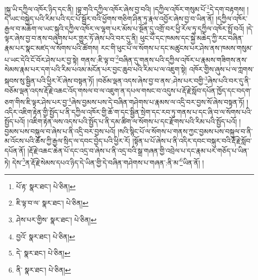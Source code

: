 །སྐུ་ཡི་དཀྱིལ་འཁོར་ཉིད་དང་ནི། །བྷ་གའི་དཀྱིལ་འཁོར་ཞེས་བྱ་བའི། །དཀྱིལ་འཁོར་གསུམ་པོ་\footnote{པོ་རྟ་  སྣར་ཐང་།  པེ་ཅིན། }དེ་དག་བརྟགས། །དེ་ཡང་བསྐྱེད་པའི་རིམ་པའི་དང་པོ་སྦྱོར་བའི་ཕྱོགས་གཅིག་ཤིན་ཏུ་རྣལ་འབྱོར་ཞེས་བྱ་བ་ཡིན་ནོ། །དཀྱིལ་འཁོར་རྒྱལ་བ་མཆོག་ལ་ཡང་སྐུའི་དཀྱིལ་འཁོར་ལ་ལྷག་པར་མོས་པ་སྔོན་དུ་འགྲོ་བར་ཕྱི་རོལ་ཏུ་དཀྱིལ་འཁོར་སྤྲོ་བའོ། །དེ་ལྟར་ཞེས་བྱ་བ་ནས་བཞུགས་པར་གྱུར་ཏོ་ཞེས་པའི་བར་དུ་ནི། ཕུང་པོ་དང་ཁམས་དང་སྐྱེ་མཆེད་ཀྱི་རང་བཞིན་རྣམ་པར་སྣང་མཛད་ལ་སོགས་པའི་ཚོགས། རང་གི་ཕུང་པོ་ལ་སོགས་པ་དང་མཚུངས་པར་ཤེས་ནས་ཁམས་གསུམ་པ་ཡང་དེའི་ངོ་བོར་ཤེས་པར་བྱ་སྟེ། གནས་:ཇི་ལྟ་བ་\footnote{ཇི་ལྟ་བ་ལ་  སྣར་ཐང་།  པེ་ཅིན། }བཞིན་དུ་གནས་པའི་དཀྱིལ་འཁོར་པ་རྣམས་གཟིགས་ནས་སེམས་རྣམ་པར་དག་པའི་རིམ་པའམ་མངོན་པར་བྱང་ཆུབ་པའི་རིམ་པ་ལ་འཇུག་སྟེ། འཁོར་གྱིས་ཞུས་པ་ལ་ཀླགས་སྐབས་སུ་སྦྱིན་པའི་ཕྱིར་རོ་ཞེས་བསྟན་ཏོ། །བཅོམ་ལྡན་འདས་ཞེས་བྱ་བ་ནས་:ཤེས་པར་བགྱི་\footnote{ཤེས་པར་གྱིས་  སྣར་ཐང་།  པེ་ཅིན། }ཞེས་པའི་བར་དུ་ནི་བཅོམ་ལྡན་འདས་རྡོ་རྗེ་འཆང་འོད་གསལ་བ་ལ་འཇུག་ན་དཔལ་གསང་བ་འདུས་པ་རྡོ་རྗེ་སློབ་དཔོན་ཁྱོད་དང་བདག་ཅག་གིས་ཇི་ལྟར་ཤེས་པར་བྱ་\footnote{བྱའོ་  སྣར་ཐང་།  པེ་ཅིན། }ཞེས་བྱམས་པས་དེ་བཞིན་གཤེགས་པ་རྣམས་ལ་འདྲི་བར་བྱས་སོ་ཞེས་བསྟན་ཏོ། །འདིར་འཇིག་རྟེན་གྱི་སྤྱོད་པ་ནི་དཀྱིལ་འཁོར་གྱི་ཆོ་ག་དང་སྦྱིན་སྲེག་དང་རབ་ཏུ་གནས་པ་དང་ཞི་བ་ལ་སོགས་པའི་སྤྱོད་པའོ། །འཇིག་རྟེན་ལས་འདས་པའི་སྤྱོད་པ་ནི་དམ་ཚིག་ལ་སོགས་པ་དང་རྫོགས་པའི་རིམ་པའི་སྤྱོད་པའོ། །བྱམས་པས་བསྐུལ་བ་ཞེས་པ་ནི་འདྲི་བར་བྱས་པའོ། །སའི་སྙིང་པོ་ལ་སོགས་པ་གནས་ཀྱང་བྱམས་པས་བསྐུལ་བ་ནི་མ་འོངས་པའི་ཆོས་ཀྱི་རྒྱལ་སྲིད་ལ་དབང་བྱེད་པའི་ཕྱིར་རོ། །སྟོན་པ་པོ་ཞེས་པ་ནི་འདིར་དབང་བསྐུར་བའི་རྡོ་རྗེ་སློབ་དཔོན་ནོ། །རྡོ་རྗེ་འཆང་ཆེན་པོ་དང་འདྲ་བ་ཞེས་པ་ནི་འདྲ་བའི་སྒྲ་གཞན་གྱི་འབྲེལ་པ་དང་རྣམ་པར་གཅོད་པ་ཡིན་ཏེ། དེས་\footnote{དེ་  སྣར་ཐང་།  པེ་ཅིན། }ན་རྡོ་རྗེ་སེམས་དཔའ་ཉིད་དེ་ཡིན་གྱི་དེ་བཞིན་གཤེགས་པ་གཞན་:ནི་མ་\footnote{ནི་  སྣར་ཐང་།  པེ་ཅིན། }ཡིན་ནོ། །
